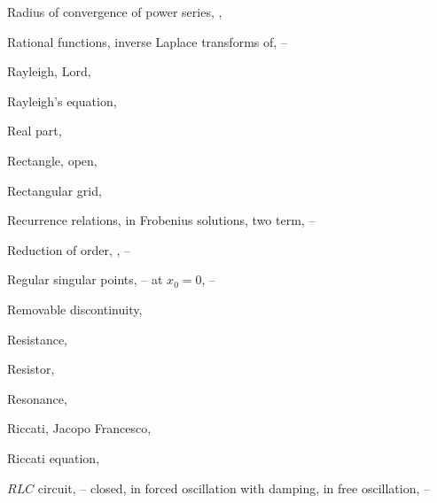 \begin{theindex}
  \item Radius of convergence of power series, \pageref{thmtype:7.1.2}, \pageref{thmtype:7.1.3}

  \item Rational functions, inverse Laplace transforms of, \pageref{example:8.2.4}--\pageref{exer:8.2.10}

  \item Rayleigh, Lord, \pageref{eq:4.4.20}

  \item Rayleigh's equation, \pageref{exer:4.4.20}

  \item Real part, \pageref{eq:5.2.17}

  \item Rectangle, open, \pageref{thmtype:2.3.1}

  \item Rectangular grid, \pageref{figure:1.3.1}

  \item Recurrence relations, \pageref{eq:7.2.16}
    \subitem in Frobenius solutions, \pageref{eq:7.5.14}
    \subitem two term, \pageref{eq:7.5.20}--\pageref{eq:7.5.26}

  \item Reduction of order, \pageref{eq:5.2.10}, \pageref{eq:5.6.1}--\pageref{exer:5.6.40}

  \item Regular singular points, \pageref{thmtype:7.4.1}--\pageref{exer:7.4.23}
    \subitem at $x_{0}=0$, \pageref{eq:7.5.1}--\pageref{exer:7.5.68}

  \item Removable discontinuity, \pageref{eq:8.1.12}

  \item Resistance, \pageref{eq:6.3.2}

  \item Resistor, \pageref{eq:6.3.2}

  \item Resonance, \pageref{exer:6.1.1}

  \item Riccati, Jacopo Francesco, \pageref{exer:2.4.55}

  \item Riccati equation, \pageref{exer:2.4.55}

  \item $RLC$ circuit, \pageref{exer:6.2.26}--\pageref{exer:6.3.1}
    \subitem closed, \pageref{exer:6.2.26}
    \subitem in forced oscillation with damping, \pageref{eq:6.3.17}
    \subitem in free oscillation, \pageref{eq:6.3.8}--\pageref{eq:6.3.17}


\end{theindex}
